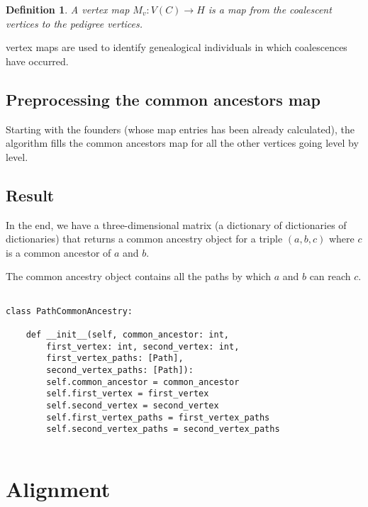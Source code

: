 \documentclass[14pt]{extarticle}
\newtheorem{definition}{Definition}
\begin{document}
\begin{definition}
A vertex map $M_v:V(C) \rightarrow H$ is a map from the coalescent vertices to the pedigree vertices.   
\end{definition}
vertex maps are used to identify genealogical individuals in which coalescences have occurred. 

\subsection{Preprocessing the common ancestors map}

Starting with the founders (whose map entries has been already calculated), the algorithm fills the common ancestors map for all the other vertices going level by level.

\subsection{Result}

In the end, we have a three-dimensional matrix (a dictionary of dictionaries of dictionaries) that returns a common ancestry object for a triple $(a, b, c)$ where $c$ is a common ancestor of $a$ and $b$.

The common ancestry object contains all the paths by which $a$ and $b$ can reach $c$.

\begin{lstlisting}

class PathCommonAncestry:
	
	def __init__(self, common_ancestor: int,
		first_vertex: int, second_vertex: int,
		first_vertex_paths: [Path],
		second_vertex_paths: [Path]):
		self.common_ancestor = common_ancestor
		self.first_vertex = first_vertex
		self.second_vertex = second_vertex
		self.first_vertex_paths = first_vertex_paths
		self.second_vertex_paths = second_vertex_paths
	

\end{lstlisting}

\newpage

\section{Alignment}

\vspace*{-\baselineskip}
\end{document}
